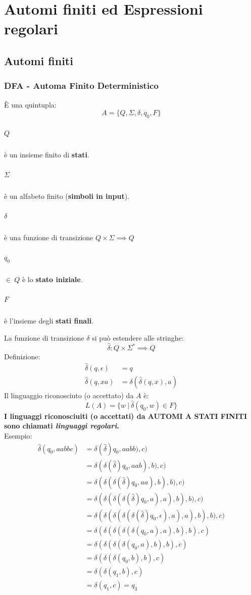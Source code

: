 \documentclass[12pt]{article}
\begin{document}
\section{Automi finiti ed Espressioni regolari}
\subsection{Automi finiti}
\subsubsection{DFA - Automa Finito Deterministico}
È una quintupla:
\begin{equation*}
    A=\{Q,\Sigma,\delta,q_0,F\}
\end{equation*}
\subparagraph*{$Q$} è un insieme finito di \textbf{stati}.
\subparagraph*{$\Sigma$} è un alfabeto finito (\textbf{simboli in input}).
\subparagraph*{$\delta$} è una funzione di transizione $Q\times\Sigma\implies Q$
\subparagraph*{$q_0$} $\in\ Q$ è lo \textbf{stato iniziale}.
\subparagraph*{$F$} è l'insieme degli \textbf{stati finali}.

La funzione di transizione $\delta$ si può estendere alle stringhe:
\begin{equation*}
    \hat{\delta}:Q\times\Sigma^*\implies Q
\end{equation*}
Definizione:
\begin{align*} 
    \hat{\delta}(q,\epsilon)&=q\\ 
    \hat{\delta}(q,xa)&=\delta(\hat{\delta}(q,x),a) 
\end{align*}
Il linguaggio riconosciuto (o accettato) da $A$ è:
\begin{equation*}
    L(A)=\{w\ |\ \hat{\delta}(q_0,w) \in F\}
\end{equation*}
\textbf{I linguaggi riconosciuiti (o accettati) da AUTOMI A STATI FINITI sono chiamati \textit{linguaggi regolari}.}\\
Esempio:
\begin{align*}
    \hat{\delta}(q_0, aabbc) &= \delta(\hat{\delta})q_0, aabb), c)\\ &=\delta(\delta(\hat{\delta})q_0, aab), b), c)\\ &=
    \delta(\delta(\delta(\hat{\delta})q_0, aa), b), b), c)\\ &=\delta(\delta(\delta(\delta(\hat{\delta})q_0,a), a), b), b), c)\\ &=
    \delta(\delta(\delta(\delta(\delta(\hat{\delta})q_0, \epsilon), a), a), b), b), c)\\ &=\delta(\delta(\delta(\delta(\delta(q_0,a), a), b), b), c)\\ &=
    \delta(\delta(\delta(\delta(q_0,a), b), b), c)\\ &=\delta(\delta(\delta(q_0,b), b), c)\\ &=\delta(\delta(q_1,b), c)\\ &=
    \delta(q_1,c) = q_3 
\end{align*}
\end{document}
